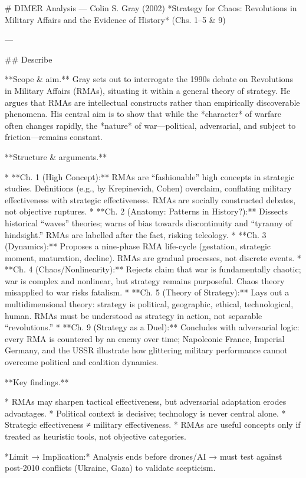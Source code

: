 # DIMER Analysis — Colin S. Gray (2002) *Strategy for Chaos: Revolutions in Military Affairs and the Evidence of History* (Chs. 1–5 & 9)

---

## Describe

**Scope & aim.**
Gray sets out to interrogate the 1990s debate on Revolutions in Military Affairs (RMAs), situating it within a general theory of strategy. He argues that RMAs are intellectual constructs rather than empirically discoverable phenomena. His central aim is to show that while the *character* of warfare often changes rapidly, the *nature* of war—political, adversarial, and subject to friction—remains constant.

**Structure & arguments.**

* **Ch. 1 (High Concept):** RMAs are “fashionable” high concepts in strategic studies. Definitions (e.g., by Krepinevich, Cohen) overclaim, conflating military effectiveness with strategic effectiveness. RMAs are socially constructed debates, not objective ruptures.
* **Ch. 2 (Anatomy: Patterns in History?):** Dissects historical “waves” theories; warns of bias towards discontinuity and “tyranny of hindsight.” RMAs are labelled after the fact, risking teleology.
* **Ch. 3 (Dynamics):** Proposes a nine-phase RMA life-cycle (gestation, strategic moment, maturation, decline). RMAs are gradual processes, not discrete events.
* **Ch. 4 (Chaos/Nonlinearity):** Rejects claim that war is fundamentally chaotic; war is complex and nonlinear, but strategy remains purposeful. Chaos theory misapplied to war risks fatalism.
* **Ch. 5 (Theory of Strategy):** Lays out a multidimensional theory: strategy is political, geographic, ethical, technological, human. RMAs must be understood as strategy in action, not separable “revolutions.”
* **Ch. 9 (Strategy as a Duel):** Concludes with adversarial logic: every RMA is countered by an enemy over time; Napoleonic France, Imperial Germany, and the USSR illustrate how glittering military performance cannot overcome political and coalition dynamics.

**Key findings.**

* RMAs may sharpen tactical effectiveness, but adversarial adaptation erodes advantages.
* Political context is decisive; technology is never central alone.
* Strategic effectiveness ≠ military effectiveness.
* RMAs are useful concepts only if treated as heuristic tools, not objective categories.

*Limit → Implication:* Analysis ends before drones/AI → must test against post-2010 conflicts (Ukraine, Gaza) to validate scepticism.

